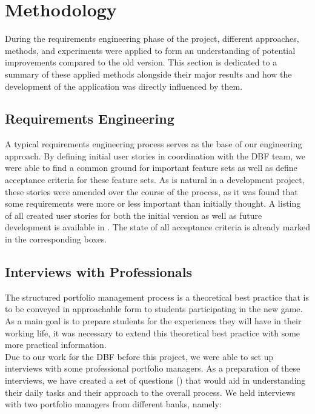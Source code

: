 \section{Methodology}
\label{sec:methodology}

During the requirements engineering phase of the project, different approaches, methods, and experiments were applied to form an understanding of potential improvements compared to the old version. This section is dedicated to a summary of these applied methods alongside their major results and how the development of the application was directly influenced by them.


\subsection{Requirements Engineering}
A typical requirements engineering process serves as the base of our engineering approach. By defining initial user stories in coordination with the DBF team, we were able to find a common ground for important feature sets as well as define acceptance criteria for these feature sets. As is natural in a development project, these stories were amended over the course of the process, as it was found that some requirements were more or less important than initially thought. A listing of all created user stories for both the initial version as well as future development is available in . The state of all acceptance criteria is already marked in the corresponding boxes.\\


\subsection{Interviews with Professionals}
The structured portfolio management process is a theoretical best practice that is to be conveyed in approachable form to students participating in the new game. As a main goal is to prepare students for the experiences they will have in their working life, it was necessary to extend this theoretical best practice with some more practical information. \\

Due to our work for the DBF before this project, we were able to set up interviews with some professional portfolio managers. As a preparation of these interviews, we have created a set of questions () that would aid in understanding their daily tasks and their approach to the overall process. We held interviews with two portfolio managers from different banks, namely:

